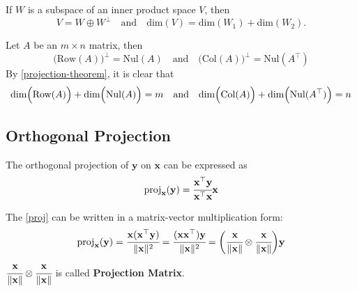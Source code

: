 \begin{Thm}\label{projection-theorem}
    If $W$ is a subspace of an inner product space $V$, then 
    \begin{equation*}
        V = W \oplus W^\perp\quad  \text{and}\quad  \text{dim}(V) = \text{dim}(W_1) + \text{dim}(W_2).
    \end{equation*}
\end{Thm}
\begin{Thm}\label{5-3}
    Let $A$ be an $m\times n$ matrix, then
    \begin{equation}
        \Big(\text{Row}(A) \Big)^\perp = \text{Nul}(A)\quad \text{and}\quad \Big(\text{Col}(A) \Big)^\perp = \text{Nul}(A^\top)
    \end{equation}
    By \cref{projection-theorem}, it is clear that
    \begin{equation}
        \text{dim}\Big(\text{Row}(A)\Big) + \text{dim}\Big(\text{Nul}(A)\Big) = m \quad \text{and}\quad \text{dim}\Big( \text{Col}(A)\Big) + \text{dim}\Big(\text{Nul}(A^{\top}) \Big) = n
    \end{equation}
\end{Thm}
\subsection{Orthogonal Projection}
The orthogonal projection of $\mathbf{y}$ on $\mathbf{x}$ can be expressed as
\begin{equation}\label{proj}
    \text{proj}_{\mathbf{x}}(\mathbf{y}) = \cfrac{\mathbf{x}^{\top} \mathbf{y}}{\mathbf{x}^{\top} \mathbf{x}} \mathbf{x}
\end{equation}

\noindent The \cref{proj} can be written in a matrix-vector multiplication form:
\begin{equation} \label{inner product}
    \text{proj}_{\mathbf{x}}(\mathbf{y}) = \cfrac{\mathbf{x}(\mathbf{x}^{\top}\mathbf{y})}{\lVert \mathbf{x} \rVert^2}  = \cfrac{(\mathbf{x}\mathbf{x}^{\top})\mathbf{y}}{\lVert \mathbf{x} \rVert^2} = \bigg(\cfrac{\mathbf{x}}{\lVert \mathbf{x} \rVert} \otimes \cfrac{\mathbf{x}}{\lVert \mathbf{x} \rVert} \bigg) \mathbf{y}
\end{equation}
$\cfrac{\mathbf{x}}{\lVert \mathbf{x} \rVert} \otimes \cfrac{\mathbf{x}}{\lVert \mathbf{x} \rVert}$ is called \textbf{Projection Matrix}. 

